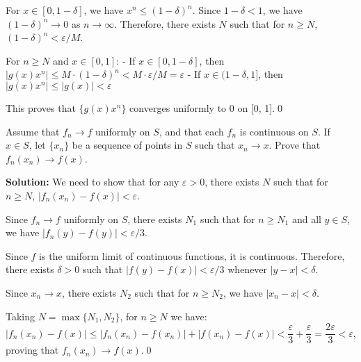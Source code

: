 For \( x \in [0, 1 - \delta] \), we have \( x^n \leq (1 - \delta)^n \). Since \( 1 - \delta < 1 \), we have \( (1 - \delta)^n \to 0 \) as \( n \to \infty \). Therefore, there exists \( N \) such that for \( n \geq N \), \( (1 - \delta)^n < \varepsilon/M \).

For \( n \geq N \) and \( x \in [0, 1] \):
- If \( x \in [0, 1 - \delta] \), then \( |g(x)x^n| \leq M \cdot (1 - \delta)^n < M \cdot \varepsilon/M = \varepsilon \)
- If \( x \in (1 - \delta, 1] \), then \( |g(x)x^n| \leq |g(x)| < \varepsilon \)

This proves that \( \{g(x)x^n\} \) converges uniformly to 0 on [0, 1].\qed


\begin{problembox}
Assume that \( f_n \to f \) uniformly on \( S \), and that each \( f_n \) is continuous on \( S \). If \( x \in S \), let \( \{x_n\} \) be a sequence of points in \( S \) such that \( x_n \to x \). Prove that \( f_n(x_n) \to f(x) \).
\end{problembox}

\bigskip\noindent\textbf{Solution:} We need to show that for any \( \varepsilon > 0 \), there exists \( N \) such that for \( n \geq N \), \( |f_n(x_n) - f(x)| < \varepsilon \).

Since \( f_n \to f \) uniformly on \( S \), there exists \( N_1 \) such that for \( n \geq N_1 \) and all \( y \in S \), we have \( |f_n(y) - f(y)| < \varepsilon/3 \).

Since \( f \) is the uniform limit of continuous functions, it is continuous. Therefore, there exists \( \delta > 0 \) such that \( |f(y) - f(x)| < \varepsilon/3 \) whenever \( |y - x| < \delta \).

Since \( x_n \to x \), there exists \( N_2 \) such that for \( n \geq N_2 \), we have \( |x_n - x| < \delta \).

Taking \( N = \max\{N_1, N_2\} \), for \( n \geq N \) we have:
\[|f_n(x_n) - f(x)| \leq |f_n(x_n) - f(x_n)| + |f(x_n) - f(x)| < \frac{\varepsilon}{3} + \frac{\varepsilon}{3} = \frac{2\varepsilon}{3} < \varepsilon,\]
proving that \( f_n(x_n) \to f(x) \).\qed


